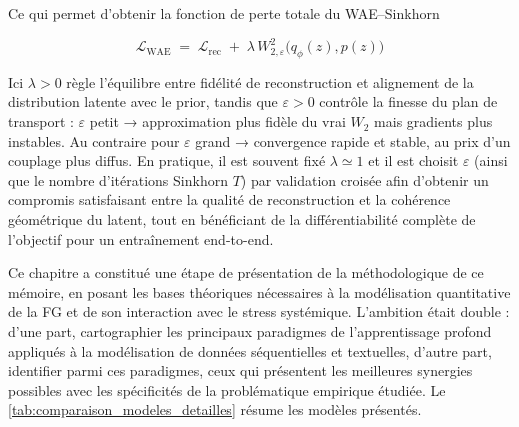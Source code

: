 Ce qui permet d'obtenir la fonction de perte totale du WAE–Sinkhorn

\begin{equation}
\boxed{\;
\mathcal{L}_{\text{WAE}}
\;=\;
\mathcal{L}_{\text{rec}}
\;+\;
\lambda\,
W_{2,\varepsilon}^{2}\bigl(q_\phi(z),p(z)\bigr)
\;}
\end{equation}

Ici $\lambda>0$ règle l’équilibre entre fidélité de reconstruction et alignement de la distribution latente avec le prior, tandis que $\varepsilon>0$ contrôle la finesse du plan de transport : $\varepsilon$ petit  →  approximation plus fidèle du vrai $W_2$ mais gradients plus instables. Au contraire pour $\varepsilon$ grand  →  convergence rapide et stable, au prix d’un couplage plus diffus. En pratique, il est souvent fixé  $\lambda\simeq1$ et il est choisit $\varepsilon$ (ainsi que le nombre d’itérations Sinkhorn $T$) par validation croisée afin d’obtenir un compromis satisfaisant entre la qualité de reconstruction et la cohérence géométrique du latent, tout en bénéficiant de la différentiabilité complète de l’objectif pour un entraînement end-to-end.

\newpage

Ce chapitre a constitué une étape de présentation de la méthodologique de ce mémoire, en posant les bases théoriques nécessaires à la modélisation quantitative de la FG et de son interaction avec le stress systémique. L’ambition était double : d’une part, cartographier les principaux paradigmes de l’apprentissage profond appliqués à la modélisation de données séquentielles et textuelles, d’autre part, identifier parmi ces paradigmes, ceux qui présentent les meilleures synergies possibles avec les spécificités de la problématique empirique étudiée. Le \autoref{tab:comparaison_modeles_detailles} résume les modèles présentés. 


